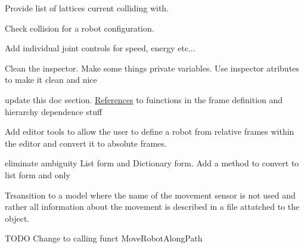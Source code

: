 \begin{DoxyRefList}
\label{todo__todo000008}%
%
Provide list of lattices current colliding with.

\label{todo__todo000009}%
%
Check collision for a robot configuration.  
\item[Class \mbox{\hyperlink{class_joint_class}{Joint\+Class}} ]\label{todo__todo000010}%
%
Add individual joint controls for speed, energy etc... 



Clean the inspector. Make some things private variables. Use inspector atributes to make it clean and nice

\label{todo__todo000011}%
%
update this doc section. \mbox{\hyperlink{class_references}{References}} to fuinctions in the frame definition and hierarchy dependence stuff

\label{todo__todo000012}%
%
Add editor tools to allow the user to define a robot from relative frames within the editor and convert it to absolute frames. 
\item[Class \mbox{\hyperlink{class_movement}{Movement}} ]\label{todo__todo000013}%
%
eliminate ambiguity List form and Dictionary form. Add a method to convert to list form and only  
\item[Member \mbox{\hyperlink{class_robot_script_aaaacc0eacd09c68f0e399dfb780c16a3}{Robot\+Script.Get\+Possible\+Movement\+Sensors}} ()]\label{todo__todo000014}%
%
Trsansition to a model where the name of the movement sensor is not used and rather all information about the movement is described in a file attatched to the object. ~\newline
  
\item[Member \mbox{\hyperlink{class_robot_script_a9213947f626c88acf4ce793020a9ef3d}{Robot\+Script.Move\+To\+Node}} (Game\+Object End\+Node)]\label{todo__todo000015}%
%
TODO Change to calling funct Move\+Robot\+Along\+Path 
\end{DoxyRefList}